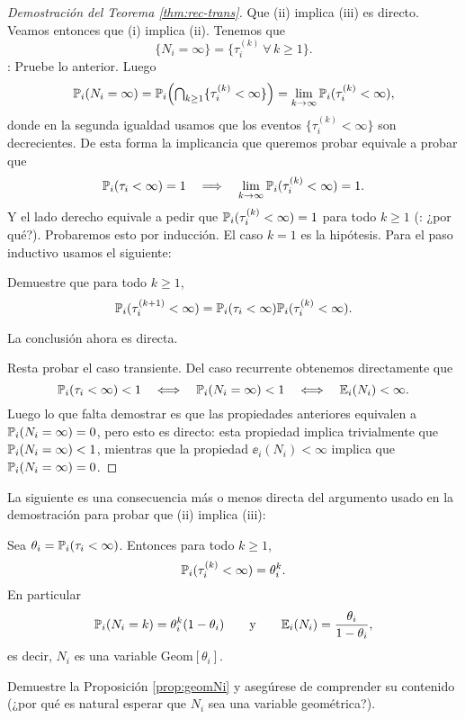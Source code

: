 \begin{proof}[Demostración del Teorema \ref{thm:rec-trans}]
Que (ii) implica (iii) es directo.
Veamos entonces que (i) implica (ii).
Tenemos que
\[\{N_i=\infty\}=\{\tau_i^{(k)}~\forall\,k\geq1\}.\]
\uexer: Pruebe lo anterior.
Luego
\[\mathbb{P}_i(N_i=\infty)=\mathbb{P}_i\Big({\textstyle\bigcap_{k\geq1}}\{\tau^{(k)}_i<\infty\}\Big)=\lim_{k\to\infty}\mathbb{P}_i(\tau^{(k)}_i<\infty),\]
donde en la segunda igualdad usamos que los eventos $\{\tau^{(k)}_i<\infty\}$ son decrecientes.
De esta forma la implicancia que queremos probar equivale a probar que 
\begin{equation}
\mathbb{P}_i(\tau_i<\infty)=1\quad\Longrightarrow\quad\lim_{k\to\infty}\mathbb{P}_i(\tau^{(k)}_i<\infty)=1.
\end{equation}
Y el lado derecho equivale a pedir que $\mathbb{P}_i(\tau^{(k)}_i<\infty)=1$ para todo $k\geq1$ (\uexers: ¿por qué?).
Probaremos esto por inducción.
El caso $k=1$ es la hipótesis.
Para el paso inductivo usamos el siguiente:
\begin{exer}
Demuestre que para todo $k\geq1$,
\[\mathbb{P}_i(\tau^{(k+1)}_i<\infty)=\mathbb{P}_i(\tau_i<\infty)\mathbb{P}_i(\tau^{(k)}_i<\infty).\]
\end{exer}
\noindent La conclusión ahora es directa.

Resta probar el caso transiente.
Del caso recurrente obtenemos directamente que
\[\mathbb{P}_i(\tau_i<\infty)<1\quad\Longleftrightarrow\quad\mathbb{P}_i(N_i=\infty)<1\quad\Longleftrightarrow\quad\mathbb{E}_i(N_i)<\infty.\]
Luego lo que falta demostrar es que las propiedades anteriores equivalen a $\mathbb{P}_i(N_i=\infty)=0$, pero esto es directo: esta propiedad implica trivialmente que $\mathbb{P}_i(N_i=\infty)<1$, mientras que la propiedad $\ee_i(N_i)<\infty$ implica que $\mathbb{P}_i(N_i=\infty)=0$.
\end{proof}

La siguiente es una consecuencia más o menos directa del argumento usado en la demostración para probar que (ii) implica (iii):

\begin{prop}\label{prop:geomNi}
Sea $\theta_i=\mathbb{P}_i(\tau_i<\infty)$.
Entonces para todo $k\geq1$,
\[\mathbb{P}_i(\tau^{(k)}_i<\infty)=\theta_i^k.\]
En particular
\[\mathbb{P}_i(N_i=k)=\theta_i^k(1-\theta_i)\qquad\text{y}\qquad\mathbb{E}_i(N_i)=\frac{\theta_i}{1-\theta_i},\]
es decir, $N_i$ es una variable Geom$[\theta_i]$.
\end{prop}

\begin{exer}
Demuestre la Proposición \ref{prop:geomNi} y asegúrese de comprender su contenido (¿por qué es natural esperar que $N_i$ sea una variable geométrica?).
\end{exer}

